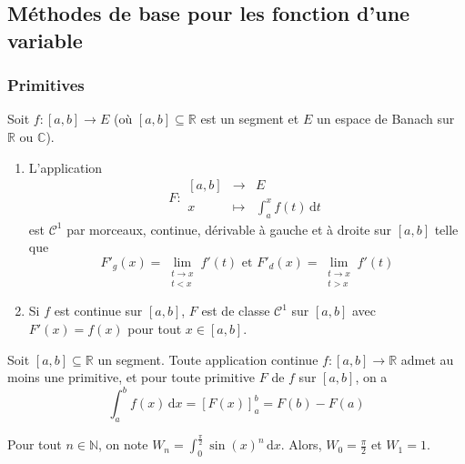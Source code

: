 



  \subsection{Méthodes de base pour les fonction d'une variable}

  \subsubsection{Primitives}


  \begin{theorem}
    Soit $f : [a,b] \rightarrow E$ (où $[a,b] \subseteq \mathbb{R}$ est un segment et $E$ un espace de Banach sur $\mathbb{R}$ ou $\mathbb{C}$).
    \begin{enumerate}[label={\bfseries(\roman*)}]
      \item L'application
      \[
      F :
      \begin{array}{ccc}
        [a,b] &\rightarrow& E \\
        x &\mapsto& \int_a^x f(t) \, \mathrm{d}t
      \end{array}
      \]
      est $\mathcal{C}^1$ par morceaux, continue, dérivable à gauche et à droite sur $[a,b]$ telle que
      \[ F'_g(x) = \lim_{\substack{t \rightarrow x\\t < x}} f'(t) \text{ et } F'_d(x) = \lim_{\substack{t \rightarrow x\\t > x}} f'(t) \]
      \item Si $f$ est continue sur $[a,b]$, $F$ est de classe $\mathcal{C}^1$ sur $[a,b]$ avec $F'(x) = f(x)$ pour tout $x \in [a,b]$.
    \end{enumerate}
  \end{theorem}

  \begin{corollary}
    Soit $[a,b] \subseteq \mathbb{R}$ un segment. Toute application continue $f : [a,b] \rightarrow \mathbb{R}$ admet au moins une primitive, et pour toute primitive $F$ de $f$ sur $[a,b]$, on a
    \[ \int_a^b f(x) \, \mathrm{d}x = \left[ F(x) \right]^b_a = F(b) - F(a) \]
  \end{corollary}

  \begin{example}
    \label{236-1}
    Pour tout $n \in \mathbb{N}$, on note $W_n = \int_{0}^{\frac{\pi}{2}} \sin(x)^n \, \mathrm{d}x$. Alors, $W_0 = \frac{\pi}{2}$ et $W_1 = 1$.
  \end{example}

